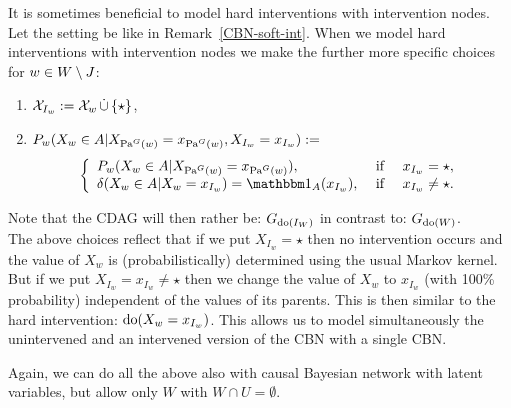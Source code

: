 \begin{Rem}
    It is sometimes beneficial to model hard interventions with intervention nodes.
    Let the setting be like in Remark~\ref{CBN-soft-int}.
    When we model hard interventions with intervention nodes we make the further more specific choices for $ w\in W \setminus J$:
    \begin{enumerate}
        \item $\mathcal{X}_{I_w} := \mathcal{X}_w \,\dot{\cup}\, \{\star\}$,
        \item $ P_w(X_w \in A|X_{\mathrm{Pa}^G(w)}=x_{\mathrm{Pa}^G(w)} ,X_{I_w}=x_{I_w}) : =$
            \[ \left\{ \begin{array}{lll}
                    P_w(X_w \in A|X_{\Pa^G(w)}=x_{\Pa^G(w)}), & \text{ if } & x_{I_w} = \star, \\
                        \delta(X_w \in A|X_w =x_{I_w}) = \I_A(x_{I_w}),  & \text{ if } & x_{I_w} \neq \star. 
                \end{array}\right.\]
    \end{enumerate}
    Note that the CDAG will then rather be: $G_{\operatorname{do}(I_W)}$ in contrast to: $G_{\operatorname{do}(W)}$. \\
    The above choices reflect that if we put $X_{I_w} = \star$ then no intervention occurs and the value of $X_w$ is
    (probabilistically) determined using the usual Markov kernel. 
    But if we put 
    $X_{I_w} = x_{I_w}  \neq\star$ then we change the value of $X_w$ to $x_{I_w}$ (with 100\% probability) 
    independent of the values of its parents. 
    This is then similar to the hard intervention: $\operatorname{do}(X_w = x_{I_w})$.
    This allows us to model simultaneously the unintervened and an intervened version of the CBN with a single CBN.
\end{Rem}

\begin{Rem}
    Again, we can do all the above also with causal Bayesian network with latent variables, 
    but allow only $W$ with $W \cap U = \emptyset$.
\end{Rem}


